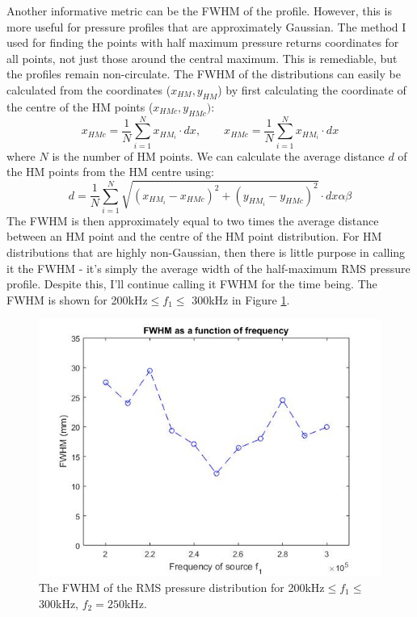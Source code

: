 \documentclass[10pt,a4paper]{article}
\begin{document}
Another informative metric can be the FWHM of the profile. However, this is more useful for pressure profiles that are approximately Gaussian. The method I used for finding the points with half maximum pressure returns coordinates for all points, not just those around the central maximum. This is remediable, but the profiles remain non-circulate. The FWHM of the distributions can easily be calculated from the coordinates ($x_{HM},y_{HM}$) by first calculating the coordinate of the centre of the HM points ($x_{HMc}, y_{HMc})$:
\begin{equation}
x_{HMc} = \frac{1}{N} \sum_{i=1}^N x_{HM_i} \cdot dx, \quad \quad x_{HMc} = \frac{1}{N} \sum_{i=1}^N x_{HM_i} \cdot dx
\end{equation}
where $N$ is the number of HM points. We can calculate the average distance $d$ of the HM points from the HM centre using:
\begin{equation}
d = \frac{1}{N}  \sum_{i=1}^N \sqrt{ (x_{HM_i} - x_{HMc})^2 + (y_{HM_i} - y_{HMc})^2} \cdot dx \alpha \beta 
\end{equation}
The FWHM is then approximately equal to two times the average distance between an HM point and the centre of the HM point distribution. For HM distributions that are highly non-Gaussian, then there is little purpose in calling it the FWHM - it's simply the average width of the half-maximum RMS pressure profile. Despite this, I'll continue calling it FWHM for the time being. The FWHM is shown for 200kHz$\leq f_1 \leq$ 300kHz in Figure \ref{FWHM_freq}.

\begin{figure}[H]\label{FWHM_freq}
\centering
\includegraphics[scale=0.6]{FWHM_freq}
\caption{The FWHM of the RMS pressure distribution for 200kHz$\leq f_1 \leq$ 300kHz, $f_2 = 250$kHz.}
\end{figure}
\end{document}
